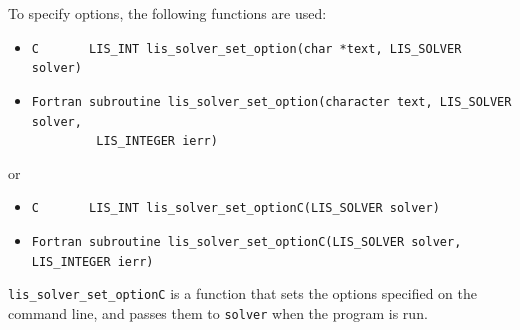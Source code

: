\documentclass[a4paper]{article}
\begin{document}
To specify options, 
the following functions are used:
\begin{itemize}
\item \verb|C       LIS_INT lis_solver_set_option(char *text, LIS_SOLVER solver)|
\item \verb|Fortran subroutine lis_solver_set_option(character text, LIS_SOLVER solver,|\\
      \verb|         LIS_INTEGER ierr)|
\end{itemize}
or
\begin{itemize}
\item \verb|C       LIS_INT lis_solver_set_optionC(LIS_SOLVER solver)|
\item \verb|Fortran subroutine lis_solver_set_optionC(LIS_SOLVER solver, LIS_INTEGER ierr)|
\end{itemize}
\verb|lis_solver_set_optionC| is a function that sets the options specified 
on the command line, and passes them to \verb|solver| when the program is run. 
\end{document}

